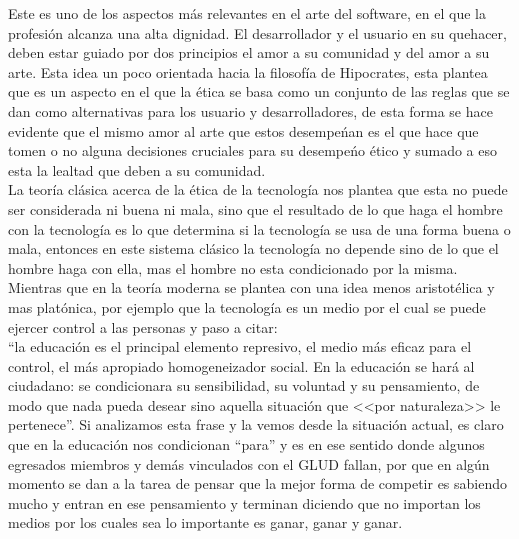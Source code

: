 \begin{multicols}{2}



Este es uno de los aspectos más relevantes en el arte del software, en el que la profesión alcanza una alta dignidad. El desarrollador y 
el usuario en su quehacer, deben estar guiado por dos principios el amor a su comunidad y del amor a su arte. Esta idea un poco orientada 
hacia la filosofía de Hipocrates, esta plantea que es un aspecto en el que la ética se basa como un conjunto de las reglas que se dan como 
alternativas para los usuario y desarrolladores, de esta forma se hace evidente que el mismo amor al arte que estos desempeńan es el 
que hace que tomen o no alguna decisiones cruciales para su desempeńo ético y sumado a eso esta la lealtad que deben a su comunidad.\\

La teoría clásica acerca de la ética de la tecnología nos plantea que esta no puede ser considerada ni buena ni mala, sino que el resultado 
de lo que haga el hombre con la tecnología es lo que determina si la tecnología se usa de una forma buena o mala, entonces en este sistema 
clásico la tecnología no depende sino de lo que el hombre haga con ella, mas el hombre no esta condicionado por la misma. Mientras que en 
la teoría moderna se plantea con una idea menos aristotélica y mas platónica, por ejemplo que la tecnología es un medio por el cual se puede 
ejercer control a las personas y paso a citar:\\
``la educación es el principal elemento represivo, el medio más eficaz para el control, el más apropiado homogeneizador social. En la 
educación se hará al ciudadano: se condicionara su sensibilidad, su voluntad y su pensamiento, de modo que nada pueda desear sino aquella 
situación que <<por naturaleza>> le pertenece''\cite{platon}. Si analizamos esta frase y la vemos desde la situación actual, es claro que 
en la educación nos condicionan ``para'' y es en ese sentido donde algunos egresados miembros y demás vinculados con el GLUD fallan, 
por que en algún momento se dan a la tarea de pensar que la mejor forma de competir es sabiendo mucho y entran en ese pensamiento y terminan 
diciendo que no importan los medios por los cuales sea lo importante es ganar, ganar y ganar.\\ 


\end{multicols}
